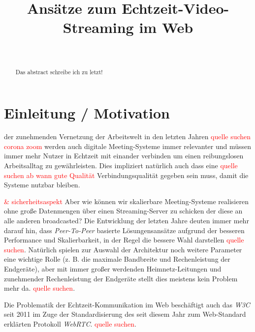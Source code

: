 \documentclass[journal]{IEEEtran}
\title{Ansätze zum Echtzeit-Video-Streaming im Web}
\author{
	\IEEEauthorblockN{Maximilian Schulke \textit{(Matrikel-Nr. 20215853)}}\\
	\IEEEauthorblockA{
		Technische Hochschule Brandenburg \\
		B.Sc. Medieninformatik \\
		Computergrafik
	}
}
\begin{document}

\maketitle

\begin{abstract}
	\lipsum[1-2][2-3]
	\lipsum[1-2][2-3]
	Das abstract schreibe ich zu letzt!
\end{abstract}

\tableofcontents

\newpage

\section{Einleitung / Motivation}
 der zunehmenden Vernetzung der Arbeitswelt
in den letzten Jahren \textcolor{red}{quelle suchen corona zoom} werden auch
digitale Meeting-Systeme immer relevanter und müssen immer mehr Nutzer in
Echtzeit mit einander verbinden um einen reibungslosen Arbeitsalltag zu
gewährleisten. Dies impliziert natürlich auch dass eine \textcolor{red}{quelle
suchen ab wann gute Qualität} Verbindungsqualität gegeben sein muss, damit die
Systeme nutzbar bleiben.

\textcolor{red}{\& sicherheitsaspekt}
Aber wie können wir skalierbare Meeting-Systeme realisieren ohne große
Datenmengen über einen Streaming-Server zu schicken der diese an alle anderen
broadcasted? Die Entwicklung der letzten Jahre deuten immer mehr darauf hin,
dass \textit{Peer-To-Peer} basierte Lösungensansätze aufgrund der besseren
Performance und Skalierbarkeit, in der Regel die bessere Wahl darstellen
\textcolor{red}{quelle suchen}. Natürlich spielen zur Auswahl der Architektur
noch weitere Parameter eine wichtige Rolle (z. B. die maximale Bandbreite und
Rechenleistung der Endgeräte), aber mit immer großer werdenden
Heimnetz-Leitungen und zunehmender Rechenleistung der Endgeräte stellt dies
meistens kein Problem mehr da. \textcolor{red}{quelle suchen}.

Die Problematik der Echtzeit-Kommunikation im Web beschäftigt auch
das \textit{W3C} seit 2011 im Zuge der Standardisierung des seit diesem Jahr
zum Web-Standard erklärten Protokoll \textit{WebRTC}. \textcolor{red}{quelle
suchen}.
\end{document}
